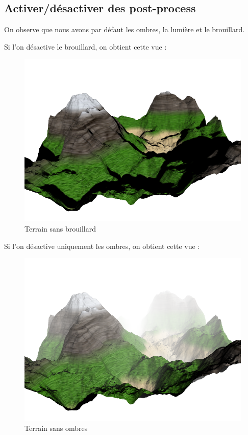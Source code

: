 \documentclass{article}
\begin{document}
\subsection{Activer/désactiver des post-process}

On observe que nous avons par défaut les ombres, la lumière et le brouillard.

Si l'on désactive le brouillard, on obtient cette vue :

\begin{figure}[h]
	\center
	\includegraphics[scale=0.30]{screen2.png}
	\caption{Terrain sans brouillard}
\end{figure}
\newpage
Si l'on désactive uniquement les ombres, on obtient cette vue :

\begin{figure}[h]
	\center
	\includegraphics[scale=0.30]{screen3.png}
	\caption{Terrain sans ombres}
\end{figure}
\end{document}
